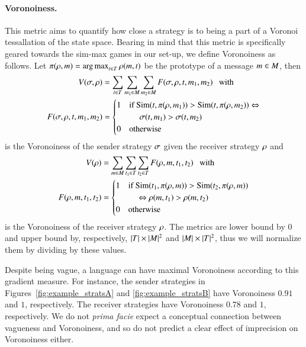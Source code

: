 \documentclass[fleqn,reqno,10pt]{article}
\newcommand{\similarity}{\ensuremath{\mathrm{Sim}}} %
\begin{document}
\paragraph{Voronoiness.}
This metric aims to quantify how close a strategy is to being a part
of a Voronoi tessallation of the state space. Bearing in mind that
this metric is specifically geared towards the sim-max games in our
set-up, we define Voronoiness as follows. Let $\pi(\rho, m) =
\operatorname*{arg\,max}_{t \in T}\rho(m,t)$ be the prototype
of a message $m \in M$, then
\begin{align*}
  V(\Sstrat, \Rstrat) & = \sum_{\state \in \States} \sum_{\messg_1 \in
    \Messgs} \sum_{\messg_2 \in \Messgs} F(\Sstrat, \Rstrat, \state,
  \messg_1, \messg_2) \text{\ \ \ with } \\
  F(\Sstrat, \Rstrat, \state,
  \messg_1, \messg_2) & =
  \begin{cases}
    1 & \text{if } \similarity(\state, \pi(\Rstrat, \messg_1)) >
    \similarity(\state, \pi(\Rstrat, \messg_2)) \bicond \\
    &  \ \ \ \ \ \Sstrat(\state, \messg_1) >
    \Sstrat(\state, \messg_2) \\
    0 & \text{otherwise}
  \end{cases}
\end{align*}
is the Voronoiness of the sender strategy $\sigma$ given the receiver
strategy $\rho$ and
\begin{align*}
  V(\Rstrat) & = \sum_{\messg \in
    \Messgs} \sum_{\state_1 \in \States}  \sum_{\state_2 \in \States}
  F(\Rstrat, \messg, \state_1, \state_2) \text{\ \ \ with } \\
  F(\Rstrat, \messg, \state_1, \state_2) & =
  \begin{cases}
    1 & \text{if } \similarity(\state_1, \pi(\Rstrat,
  \messg)) > \similarity(\state_2, \pi(\Rstrat, \messg)) \\
  & \ \ \ \ \ \bicond \Rstrat(\messg,
  \state_1) > \Rstrat(\messg, \state_2) \\
    0 & \text{otherwise}
  \end{cases}
\end{align*}
is the Voronoiness of the receiver strategy $\rho$.  The metrics
are lower bound by $0$ and upper bound by, respectively, $|T|
\times |M|^2$ and $|M| \times |T|^2$, thus we will
normalize them by dividing by these values.

Despite being vague, a language can have maximal Voronoiness according
to this gradient measure. For instance, the sender strategies in
Figures~\ref{fig:example_stratsA} and \ref{fig:example_stratsB} have
Voronoiness $0.91$ and $1$, respectively. The receiver strategies have
Voronoiness $0.78$ and $1$, respectively. We do not \emph{prima facie}
expect a conceptual connection between vagueness and Voronoiness, and
so do not predict a clear effect of imprecision on Voronoiness either.
\end{document}
